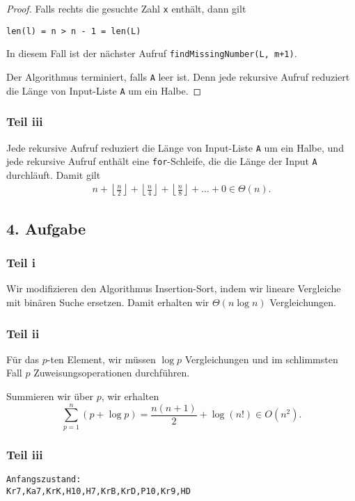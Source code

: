 \documentclass[a5paper]{article}
\newcommand{\mt}{\texttt}
\theoremstyle{remark}
\begin{document}
\begin{proof}
  Falls rechts die gesuchte Zahl \mt{x} enthält, dann gilt
\begin{verbatim}
len(l) = n > n - 1 = len(L)
\end{verbatim}
  In diesem Fall ist der nächster Aufruf \mt{findMissingNumber(L,
    m+1)}.

  Der Algorithmus terminiert, falls \mt{A} leer ist.  Denn jede
  rekursive Aufruf reduziert die Länge von Input-Liste \mt{A} um ein Halbe.
\end{proof}
\subsubsection{Teil iii}
Jede rekursive Aufruf reduziert die
Länge von Input-Liste \mt{A} um ein Halbe, und jede rekursive Aufruf
enthält eine \mt{for}-Schleife, die die Länge der Input \mt{A}
durchläuft.  Damit gilt
\begin{align*}
  n + \left \lfloor \frac{n}{2}  \right \rfloor + \left \lfloor
  \frac{n}{4} \right \rfloor + \left \lfloor \frac{n}{8}
  \right \rfloor + \ldots + 0 \in \Theta(n).
\end{align*}
\subsection{4. Aufgabe}
\subsubsection{Teil i}
Wir modifizieren den Algorithmus Insertion-Sort, indem wir lineare
Vergleiche mit binären Suche ersetzen.  Damit erhalten wir \(\Theta(n\log
n)\) Vergleichungen.

\subsubsection{Teil ii}
Für das \(p\)-ten Element, wir müssen \(\log p\) Vergleichungen
und im schlimmsten Fall \(p\) Zuweisungsoperationen durchführen.

Summieren wir über \(p\),  wir erhalten
\[ \sum_{p = 1}^{n} (p + \log p) = \frac{n(n+1)}{2} + \log (n!) \in O(n^2). \]
\subsubsection{Teil iii}
\begin{verbatim}
Anfangszustand:
Kr7,Ka7,KrK,H10,H7,KrB,KrD,P10,Kr9,HD
\end{verbatim}
\end{document}
